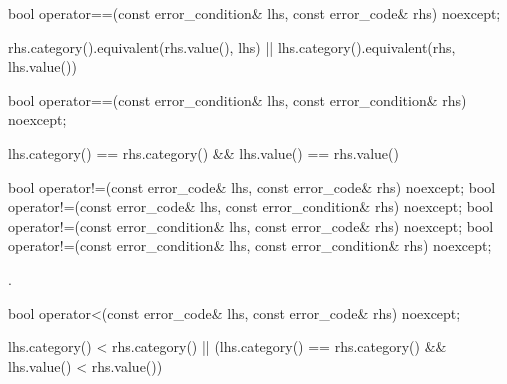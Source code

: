 %
%
\begin{itemdecl}
bool operator==(const error_condition& lhs, const error_code& rhs) noexcept;
\end{itemdecl}

\begin{itemdescr}
\pnum
\returns
\begin{codeblock}
rhs.category().equivalent(rhs.value(), lhs) || lhs.category().equivalent(rhs, lhs.value())
\end{codeblock}
\end{itemdescr}

%
\begin{itemdecl}
bool operator==(const error_condition& lhs, const error_condition& rhs) noexcept;
\end{itemdecl}

\begin{itemdescr}
\pnum
\returns
\begin{codeblock}
lhs.category() == rhs.category() && lhs.value() == rhs.value()
\end{codeblock}
\end{itemdescr}

%
%
\begin{itemdecl}
bool operator!=(const error_code& lhs, const error_code& rhs) noexcept;
bool operator!=(const error_code& lhs, const error_condition& rhs) noexcept;
bool operator!=(const error_condition& lhs, const error_code& rhs) noexcept;
bool operator!=(const error_condition& lhs, const error_condition& rhs) noexcept;
\end{itemdecl}

\begin{itemdescr}
\pnum
\returns {}.
\end{itemdescr}

%
\begin{itemdecl}
bool operator<(const error_code& lhs, const error_code& rhs) noexcept;
\end{itemdecl}

\begin{itemdescr}
\pnum
\returns
\begin{codeblock}
lhs.category() < rhs.category() ||
(lhs.category() == rhs.category() && lhs.value() < rhs.value())
\end{codeblock}
\end{itemdescr}

